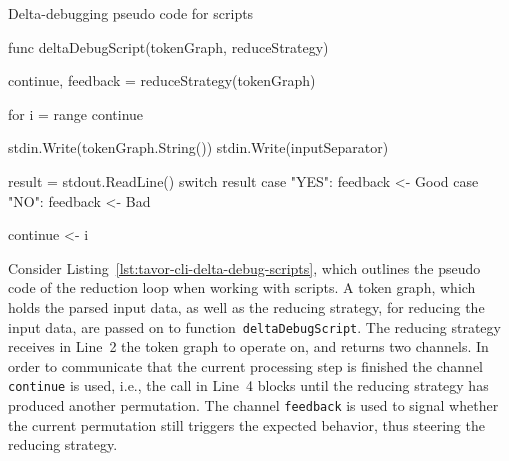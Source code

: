 \begin{listing}[H]
\caption{Delta-debugging pseudo code for scripts}
\label{lst:tavor-cli-delta-debug-scripts}
\begin{gocode}
func deltaDebugScript(tokenGraph, reduceStrategy) {
  continue, feedback = reduceStrategy(tokenGraph)

  for i = range continue {
    stdin.Write(tokenGraph.String())
    stdin.Write(inputSeparator)

    result = stdout.ReadLine()
    switch result {
      case "YES\n":
        feedback <- Good
      case "NO\n":
        feedback <- Bad
    }

    continue <- i
  }
}
\end{gocode}
\end{listing}

Consider Listing~\ref{lst:tavor-cli-delta-debug-scripts}, which outlines the pseudo code of the reduction loop when working with scripts. A token graph, which holds the parsed input data, as well as the reducing strategy, for reducing the input data, are passed on to function~\texttt{deltaDebugScript}. The reducing strategy receives in Line~2 the token graph to operate on, and returns two channels. In order to communicate that the current processing step is finished the channel \texttt{continue} is used, i.e., the call in Line~4 blocks until the reducing strategy has produced another permutation. The channel \texttt{feedback} is used to signal whether the current permutation still triggers the expected behavior, thus steering the reducing strategy.
